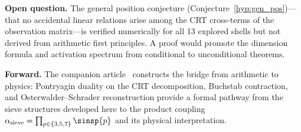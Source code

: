 \documentclass[12pt,a4paper]{article}
\begin{document}
\textbf{Open question.}
The general position conjecture (Conjecture~\ref{hyp:gen_pos})---that
no accidental linear relations arise among the CRT cross-terms of the
observation matrix---is verified numerically for all 13 explored shells
but not derived from arithmetic first principles.  A proof would promote
the dimension formula and activation spectrum from conditional to
unconditional theorems.

\textbf{Forward.}
The companion article~\cite{companion_M5} constructs the bridge from
arithmetic to physics: Pontryagin duality on the CRT decomposition,
Buchstab contraction, and Osterwalder--Schrader reconstruction provide
a formal pathway from the sieve structures developed here to the product
coupling $\alpha_{\mathrm{sieve}} = \prod_{p \in \{3,5,7\}} \sinsp{p}$
and its physical interpretation.



\end{document}
